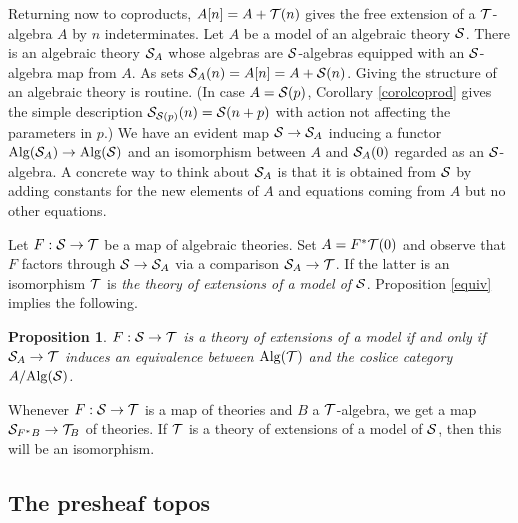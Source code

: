 \documentclass[12pt, amstex, amssymb]{article}
\newtheorem{proposition}[theorem]{Proposition}
\newcommand{\mcat}{\cal}
\begin{document}
Returning now to coproducts, $A[n] = A + {\mcat T}(n)$ gives the free extension
of a $\mcat T$-algebra $A$ by $n$ indeterminates.
Let $A$ be a model of an algebraic theory $\mcat S$.
There is an algebraic theory
${\mcat S}_A$ whose algebras are $\mcat S$-algebras
equipped with an ${\mcat S}$-algebra map from $A$. 
As sets ${\mcat S}_A(n) = A[n] = A + {\mcat S}(n)$. Giving 
the structure of an algebraic theory is routine.
(In case $A = {\mcat S}(p)$, Corollary \ref{corolcoprod}
gives the simple description
${\mcat S}_{{\mcat S}(p)}(n) = {\mcat S}(n+p)$ with action
not affecting the parameters in $p$.)
We have an evident map ${\mcat S} \to {\mcat S}_A$ inducing a functor
${\rm Alg}({\mcat S}_A) \to {\rm Alg}({\mcat S})$ and 
an isomorphism between $A$ and ${\mcat S}_A(0)$ regarded
as an $\mcat S$-algebra. A concrete way to think about
${\mcat S}_A$ 
is that it is obtained from $\mcat S$
by adding constants for the new elements of $A$
and equations coming from $A$
but no other equations.

Let $F: {\mcat S} \to {\mcat T}$ be a map of algebraic theories.
Set $A = F^*{\mcat T}(0)$ and observe that $F$  
factors through ${\mcat S} \to {\mcat S}_A$ via a comparison
${\mcat S}_A \to {\mcat T}$. If the latter is
an isomorphism $\mcat T$ is {\em the theory
of extensions of a model of} $\mcat S$. 
Proposition \ref{equiv} implies the following.
\begin{proposition}\label{algext}
$F: {\mcat S} \to {\mcat T}$ is a theory of extensions of a model
if and only if ${\mcat S}_A \to {\mcat T}$ induces an equivalence
between ${\rm Alg}({\mcat T})$ and the coslice
category $A / {\rm Alg}({\mcat S})$.
\end{proposition}
Whenever $F : {\mcat S} \to {\mcat T}$ 
is a map of theories and $B$ a $\mcat T$-algebra,
we get a map ${\mcat S}_{F^*B} \to {\mcat T}_B$ of theories.
If $\mcat T$ is a theory of extensions of a model of $\mcat S$,
then this will be an isomorphism.

\subsection{The presheaf topos}\label{topos}
\end{document}
